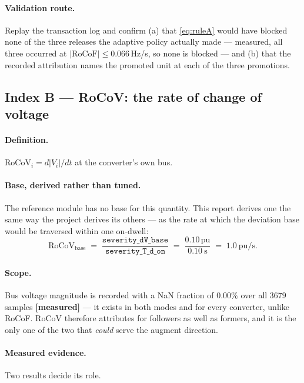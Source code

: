 \documentclass[12pt,a4paper]{article}
\theoremstyle{remark}
\newcommand{\pu}{\,\mathrm{pu}}
\newcommand{\measured}{\textcolor{ok}{\textbf{[measured]}}}
\begin{document}
\paragraph{Validation route.} Replay the transaction log and confirm (a) that
\eqref{eq:ruleA} would have blocked none of the three releases the adaptive
policy actually made --- measured, all three occurred at
$|\mathrm{RoCoF}| \le 0.066$\,Hz/s, so none is blocked --- and (b) that the
recorded attribution names the promoted unit at each of the three promotions.

\subsection{Index B --- RoCoV: the rate of change of voltage}

\paragraph{Definition.} $\mathrm{RoCoV}_i = d|V_i|/dt$ at the converter's own
bus.

\paragraph{Base, derived rather than tuned.} The reference module has no base for
this quantity. This report derives one the same way the project derives its
others --- as the rate at which the deviation base would be traversed within one
on-dwell:
\begin{equation}
\mathrm{RoCoV}_{\text{base}} \;=\;
\frac{\texttt{severity\_dV\_base}}{\texttt{severity\_T\_d\_on}}
\;=\; \frac{0.10\pu}{0.10\ \mathrm{s}} \;=\; 1.0\ \mathrm{pu/s}.
\label{eq:rocovbase}
\end{equation}

\paragraph{Scope.} Bus voltage magnitude is recorded with a NaN fraction of
$0.00\%$ over all $3679$ samples \measured{} --- it exists in both modes and for
every converter, unlike RoCoF. RoCoV therefore attributes for followers as well
as formers, and it is the only one of the two that \emph{could} serve the augment
direction.

\paragraph{Measured evidence.} Two results decide its role.
\end{document}
